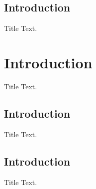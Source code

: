 \documentclass{beamer}
\begin{document}
    \subsection{Introduction}
    \begin{frame}{Title}
        Text.
    \end{frame}

    \section{Introduction}
    \begin{frame}{Title}
        Text.
    \end{frame}
    \subsection{Introduction}
    \begin{frame}{Title}
        Text.
    \end{frame}
    \subsection{Introduction}
    \begin{frame}{Title}
        Text.
    \end{frame}

    \maketitle
\end{document}
